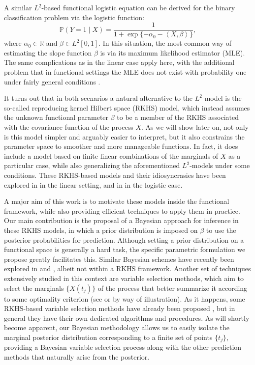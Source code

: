 \documentclass{article}
\numberwithin{equation}{section}
\theoremstyle{plain}
\theoremstyle{definition}
\newcommand{\R}{\mathbb{R}}
\newcommand\dotprod[2]{\left\langle#1,#2\right\rangle}
\begin{document}
A similar \(L^2\)-based functional logistic equation can be derived for the binary classification problem via the logistic function:
\begin{equation}\label{eq:l2-logistic-model}
  \mathbb P(Y=1 \mid X) = \frac{1}{1 + \exp\{-\alpha_0 - \dotprod{X}{\beta}\}},
\end{equation}
where \(\alpha_0 \in \R\) and \(\beta \in L^2[0, 1]\). In this situation, the most common way of estimating the slope function \(\beta\) is via its maximum likelihood estimator (MLE). The same complications as in the linear case apply here, with the additional problem that in functional settings the MLE does not exist with probability one under fairly general conditions \citep[see][]{berrendero2023functional}.

It turns out that in both scenarios a natural alternative to the \(L^2\)-model is the so-called reproducing kernel Hilbert space (RKHS) model, which instead assumes the unknown functional parameter \(\beta\) to be a member of the RKHS associated with the covariance function of the process \(X\). As we will show later on, not only is this model simpler and arguably easier to interpret, but it also constrains the parameter space to smoother and more manageable functions. In fact, it does include a model based on finite linear combinations of the marginals of \(X\) as a particular case, while also generalizing the aforementioned \(L^2\)-models under some conditions. These RKHS-based models and their idiosyncrasies have been explored in \citet{berrendero2019rkhs, berrendero2024functional} in the linear setting, and in \citet{berrendero2023functional} in the logistic case. 

A major aim of this work is to motivate these models inside the functional framework, while also providing efficient techniques to apply them in practice. Our main contribution is the proposal of a Bayesian approach for inference in these RKHS models, in which a prior distribution is imposed on \(\beta\) to use the posterior probabilities for prediction. Although setting a prior distribution on a functional space is generally a hard task, the specific parametric formulation we propose greatly facilitates this. Similar Bayesian schemes have recently been explored in \citet{grollemund2019bayesian} and \citet{abraham2024informative}, albeit not within a RKHS framework. Another set of techniques extensively studied in this context are variable selection methods, which aim to select the marginals \(\{X(t_j)\}\) of the process that better summarize it according to some optimality criterion (see \citealp{ferraty2010most} or \citealp{berrendero2016variable} by way of illustration). As it happens, some RKHS-based variable selection methods have already been proposed \citep[e.g.][]{bueno2019variable}, but in general they have their own dedicated algorithms and procedures. As will shortly become apparent, our Bayesian methodology allows us to easily isolate the marginal posterior distribution corresponding to a finite set of points \(\{t_j\}\), providing a Bayesian variable selection process along with the other prediction methods that naturally arise from the posterior.
\end{document}
